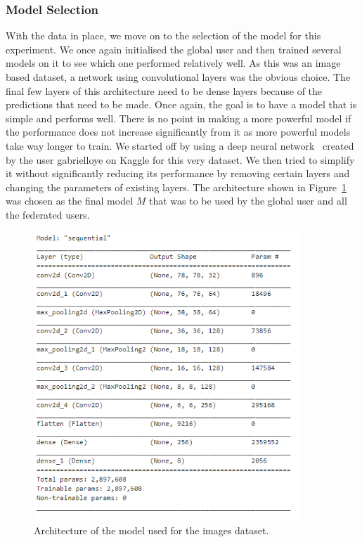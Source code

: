 \documentclass[12pt]{article}
\begin{document}
\subsubsection{Model Selection}
With the data in place, we move on to the selection of the model for this experiment. We once again initialised the global user and then trained several models on it to see which one performed relatively well. As this was an image based dataset, a network using convolutional layers was the obvious choice. The final few layers of this architecture need to be dense layers because of the predictions that need to be made. Once again, the goal is to have a model that is simple and performs well. There is no point in making a more powerful model if the performance does not increase significantly from it as more powerful models take way longer to train. We started off by using a deep neural network~\cite{kaggle:model} created by the user gabrielloye on Kaggle for this very dataset. We then tried to simplify it without significantly reducing its performance by removing certain layers and changing the parameters of existing layers. The architecture shown in Figure~\ref{fig:image_model} was chosen as the final model $M$ that was to be used by the global user and all the federated users. 
\begin{figure}[H]
	\centering
	\includegraphics[width=10cm]{resources/image_model.png}
	\caption{Architecture of the model used for the images dataset.}
	\label{fig:image_model}
\end{figure}
\end{document}
